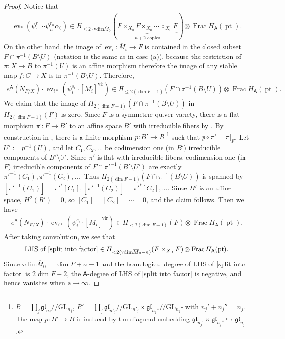 \documentclass[10pt]{amsart}
\theoremstyle{definition}
\numberwithin{equation}{section}
\newcommand{\GL}{\mathrm{GL}}
\newcommand{\vir}{\mathrm{vir}}
\newcommand{\sA}{\mathsf{A}}
\newcommand{\ev}{\operatorname{ev}}
\newcommand{\Frac}{\operatorname{Frac}}
\newcommand{\pt}{\operatorname{pt}}
\begin{document}
\begin{proof}
Notice that
\begin{align*}
\ev_*(\psi_1^{r_1}\cdots\psi_n^{r_n}\alpha_0)\in H_{\leqslant 2\cdot\mathrm{vdim}\overline{M}_0}(\underbrace{F\times_{X_0} F\times_{X_0}\cdots \times_{X_0} F}_{n+2\text{ copies}})\otimes \Frac H_\sA(\pt).
\end{align*}
On the other hand, the image of $\ev_{i}\colon \overline{M}_i\to F$ is contained in the closed subset $F\cap \pi^{-1}(B\setminus U)$ (notation is the same as in case (a)), because the restriction of $\pi\colon X\to B$ to $\pi^{-1}(U)$ is an affine morphism therefore the image of any stable map $f\colon C\to X$ is in $\pi^{-1}(B\setminus U)$. Therefore, 
\begin{align*}
e^\sA(N_{F/X})\cdot \ev_{i*}(\psi_i^{s_i}\cdot [\overline{M}_i]^{\vir})\in H_{\leqslant 2(\dim F-1)}(F\cap \pi^{-1}(B\setminus U))\otimes \Frac H_\sA(\pt).
\end{align*}
We claim that the image of $H_{2(\dim F-1)}(F\cap \pi^{-1}(B\setminus U))$ in $H_{2(\dim F-1)}(F)$ is zero. Since $F$ is a symmetric quiver variety, there is a flat morphism $\pi'\colon F\to B'$ to an affine space $B'$ with irreducible fibers by \cite[Thm.~1.1]{COZZ3}. By construction in \cite{COZZ3}, there is a finite morphism $p\colon B'\to B$ \footnote{$B=\prod_j\mathfrak{gl}_{n_j}/\!\!/\GL_{n_j}$, $B'=\prod_j\mathfrak{gl}_{n'_j}/\!\!/\GL_{n'_j}\times \mathfrak{gl}_{n_j''}/\!\!/\GL_{n_j''}$ with $n_j'+n_j''=n_j$. The map $p\colon B'\to B$ is induced by the diagonal embedding $\mathfrak{gl}_{n_j'}\times \mathfrak{gl}_{n_j''}\hookrightarrow \mathfrak{gl}_{n_j}$.} such that $p\circ \pi'=\pi|_F$. Let $U':=p^{-1}(U)$, and let $C_1,C_2,\ldots$ be codimension one (in $B'$) irreducible components of $B'\setminus U'$. Since $\pi'$ is flat with irreducible fibers, codimension one
(in $F$) irreducible components of $F\cap \pi'^{-1}(B'\setminus U')$ are exactly $\pi'^{-1}(C_1),\pi'^{-1}(C_2),\ldots$. Thus $H_{2(\dim F-1)}(F\cap \pi^{-1}(B\setminus U))$ is spanned by $[\pi'^{-1}(C_1)]=\pi'^*[C_1],[\pi'^{-1}(C_2)]=\pi'^*[C_2],\ldots$. Since $B'$ is an affine space, $H^2(B')=0$, so $[C_1]=[C_2]=\cdots=0$, and the claim follows. Then we have
\begin{align*}
e^\sA(N_{F/X})\cdot \ev_{i*}(\psi_i^{s_i}\cdot [\overline{M}_i]^{\vir})\in H_{< 2(\dim F-1)}(F)\otimes \Frac H_\sA(\pt).
\end{align*}
After taking convolution, we see that
\begin{align*}
\text{LHS of \eqref{split into factor}}\in H_{<2(\mathrm{vdim}\overline{M}_0-n)}(F\times_{X_0} F)\otimes \Frac H_\sA(\pt).
\end{align*}
Since $\mathrm{vdim}\overline{M}_0=\dim F+n-1$ and the homological degree of LHS of \eqref{split into factor} is $2\dim F-2$, the $\sA$-degree of LHS of \eqref{split into factor} is negative, and hence vanishes when $\mathsf a\to \infty$.
\end{proof}
\end{document}
